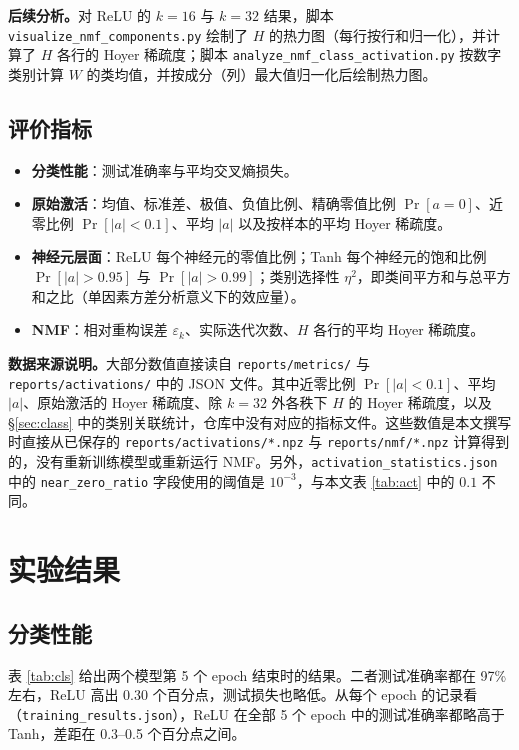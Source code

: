 \documentclass[UTF8,a4paper,11pt]{ctexart}
\newcommand{\code}[1]{\texttt{\small #1}}
\begin{document}
\textbf{后续分析。}对 ReLU 的 $k=16$ 与 $k=32$ 结果，脚本 \code{visualize\_nmf\_components.py} 绘制了 $H$ 的热力图（每行按行和归一化），并计算了 $H$ 各行的 Hoyer 稀疏度；脚本 \code{analyze\_nmf\_\allowbreak class\_activation.py} 按数字类别计算 $W$ 的类均值，并按成分（列）最大值归一化后绘制热力图。

\subsection{评价指标}

\begin{itemize}
  \item \textbf{分类性能}：测试准确率与平均交叉熵损失。
  \item \textbf{原始激活}：均值、标准差、极值、负值比例、精确零值比例 $\Pr[a=0]$、近零比例 $\Pr[|a|<0.1]$、平均 $|a|$ 以及按样本的平均 Hoyer 稀疏度。
  \item \textbf{神经元层面}：ReLU 每个神经元的零值比例；Tanh 每个神经元的饱和比例 $\Pr[|a|>0.95]$ 与 $\Pr[|a|>0.99]$；类别选择性 $\eta^2$，即类间平方和与总平方和之比（单因素方差分析意义下的效应量）。
  \item \textbf{NMF}：相对重构误差 $\varepsilon_k$、实际迭代次数、$H$ 各行的平均 Hoyer 稀疏度。
\end{itemize}

\textbf{数据来源说明。}大部分数值直接读自 \code{reports/metrics/} 与 \code{reports/activations/} 中的 JSON 文件。其中近零比例 $\Pr[|a|<0.1]$、平均 $|a|$、原始激活的 Hoyer 稀疏度、除 $k=32$ 外各秩下 $H$ 的 Hoyer 稀疏度，以及 \S\ref{sec:class} 中的类别关联统计，仓库中没有对应的指标文件。这些数值是本文撰写时直接从已保存的 \code{reports/activations/*.npz} 与 \code{reports/nmf/*.npz} 计算得到的，没有重新训练模型或重新运行 NMF。另外，\code{activation\_statistics.json} 中的 \code{near\_zero\_ratio} 字段使用的阈值是 $10^{-3}$，与本文表 \ref{tab:act} 中的 $0.1$ 不同。

\section{实验结果}

\subsection{分类性能}

表 \ref{tab:cls} 给出两个模型第 5 个 epoch 结束时的结果。二者测试准确率都在 97\% 左右，ReLU 高出 0.30 个百分点，测试损失也略低。从每个 epoch 的记录看（\code{training\_results.json}），ReLU 在全部 5 个 epoch 中的测试准确率都略高于 Tanh，差距在 0.3--0.5 个百分点之间。
\end{document}
